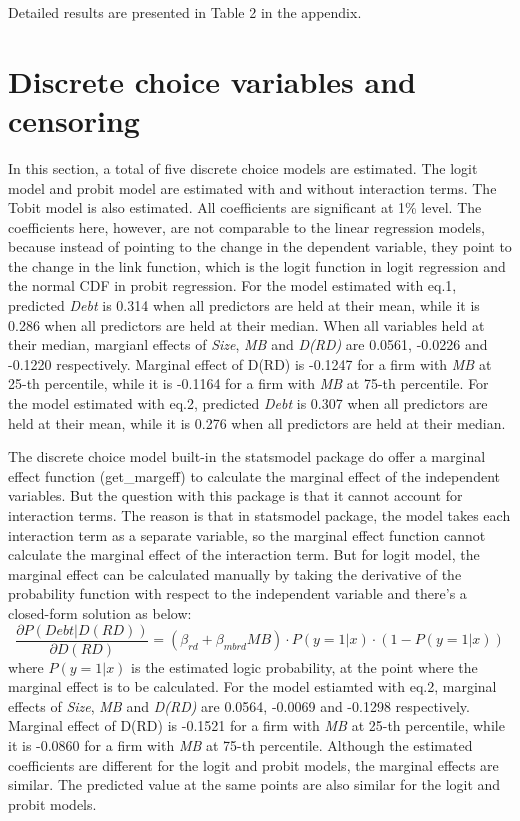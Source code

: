 \documentclass{article}
\begin{document}
Detailed results are presented in Table 2 in the appendix.

\section*{Discrete choice variables and censoring}
In this section, a total of five discrete choice models are estimated. The logit model and probit model are estimated with and without interaction terms.
The Tobit model is also estimated. All coefficients are significant at 1\% level.
The coefficients here, however, are not comparable to the linear regression models, because instead of pointing to the change in the dependent variable,
they point to the change in the link function, which is the logit function in logit regression and the normal CDF in probit regression.
For the model estimated with eq.1, predicted \textit{Debt} is 0.314 when all predictors are held at their mean, while it is 0.286 when all predictors are held at their median.
When all variables held at their median, margianl effects of \textit{Size}, \textit{MB} and \textit{D(RD)} are 0.0561, -0.0226 and -0.1220 respectively.
Marginal effect of D(RD) is -0.1247 for a firm with \textit{MB} at 25-th percentile, while it is -0.1164 for a firm with \textit{MB} at 75-th percentile.
For the model estimated with eq.2, predicted \textit{Debt} is 0.307 when all predictors are held at their mean, while it is 0.276 when all predictors are held at their median.

The discrete choice model built-in the statsmodel package do offer a marginal effect function (get\_margeff) to calculate the
marginal effect of the independent variables. But the question with this package is that it cannot account for interaction terms.
The reason is that in statsmodel package, the model takes each interaction term as a separate variable, so the marginal effect
function cannot calculate the marginal effect of the interaction term. But for logit model, the marginal effect can be calculated
manually by taking the derivative of the probability function with respect to the independent variable and there's a closed-form solution as below:
\begin{equation}
    \frac{\partial P(Debt|D(RD))}{\partial D(RD)} = (\beta_{rd} + \beta_{mbrd} MB ) \cdot P(y=1|x) \cdot (1-P(y=1|x))
\end{equation}
where $P(y=1|x)$ is the estimated logic probability, at the point where the marginal effect is to be calculated.
For the model estiamted with eq.2, marginal effects of \textit{Size}, \textit{MB} and \textit{D(RD)} are 0.0564, -0.0069 and -0.1298 respectively.
Marginal effect of D(RD) is -0.1521 for a firm with \textit{MB} at 25-th percentile, while it is -0.0860 for a firm with \textit{MB} at 75-th percentile.
Although the estimated coefficients are different for the logit and probit models, the marginal effects are similar. The predicted value at
the same points are also similar for the logit and probit models.
\end{document}
